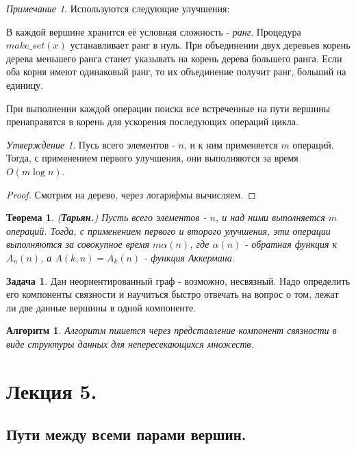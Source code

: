 \documentclass[a4paper]{article}
\theoremstyle{indented}
\newtheorem{theorem}{Теорема}
\newtheorem{alg}{Алгоритм}
\theoremstyle{definition}
\newtheorem{prob}{Задача}
\theoremstyle{remark}
\newtheorem{remark}{Примечание}
\newtheorem{stat}{Утверждение}
\begin{document}
\begin{remark}
    Используются следующие улучшения: \ 
    
    В каждой вершине хранится её условная сложность - \textit{ранг}. Процедура $make\_set(x)$ устанавливает ранг в нуль. При объединении двух деревьев корень дерева меньшего ранга станет указывать на корень дерева большего ранга. Если оба корня имеют одинаковый ранг, то их объединение получит ранг, больший на единицу. \ 

    При выполнении каждой операции поиска все встреченные на пути вершины пренаправятся в корень для ускорения последующих операций цикла.
\end{remark}

\begin{stat}
    Пусь всего элементов - $n$, и к ним применяется $m$ операций. Тогда, с применением первого улучшения, они выполняются за время $O(m \log n)$. 
\end{stat}

\begin{proof}
    Смотрим на дерево, через логарифмы вычисляем.
\end{proof}

\begin{theorem}
    (\textbf{Тарьян.}) Пусть всего элементов - $n$, и над ними выполняется $m$ операций. Тогда, с применением первого и второго улучшения, эти операции выполняются за совокупное время $m\alpha (n)$, где $\alpha(n)$ - обратная функция к $A_n(n)$, а $A(k, n)=A_k(n)$ - \textit{функция Аккермана}. 
\end{theorem}

\begin{prob}
    Дан неориентированный граф - возможно, несвязный. Надо определить его компоненты связности и научиться быстро отвечать на вопрос о том, лежат ли две данные вершины в одной компоненте.
\end{prob}

\begin{alg}
    Алгоритм пишется через представление компонент связности в виде структуры данных для непересекающихся множеств.
\end{alg}

\section{Лекция 5.}

\subsection{Пути между всеми парами вершин.}
\end{document}
